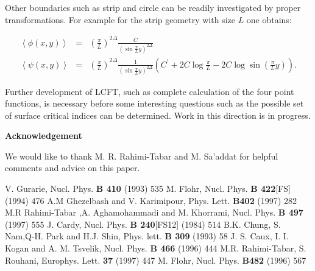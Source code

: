 Other boundaries such as strip and circle can be readily investigated by
proper transformations. For example for the strip geometry with size $L$ one obtains: 

\begin{eqnarray}
\left<\phi(x,y)\right>&=&\left(\frac {\pi}{L}
\right)^{2\Delta}\frac {C}{(\sin{\frac {\pi}{L}}{y})^{2\Delta}}\nonumber\\
\left<\psi(x,y)\right>&=&\left(\frac {\pi}{L}\right)^{2\Delta}
\frac {1}{(\sin{\frac {\pi}{L}}{y})^{2\Delta}}
\left(C^{\prime}+2C\log{\frac {\pi}{L}}-2C\log\sin({\frac {\pi}{L}}{y})
\right).
\end{eqnarray}

Further development of LCFT, such as complete calculation of the four point functions, 
is necessary before some interesting questions such as the possible 
set of surface critical indices can be determined. Work in this direction is in progress.


{\large {\bf Acknowledgement} }

We would like to thank M. R. Rahimi-Tabar and M. Sa'addat for helpful comments
and advice on this paper.

\begin{thebibliography}{99}
 V. Gurarie, Nucl. Phys. {\bf B 410} (1993) 535
 M. Flohr, Nucl. Phys. {\bf B 422}[FS] (1994) 476
 A.M Ghezelbash and V. Karimipour, Phys. Lett. {\bf B402} (1997) 282 
 M.R Rahimi-Tabar ,A. Aghamohammadi and M. Khorrami, Nucl. Phys. {\bf B 497} (1997) 555 
 J. Cardy, Nucl. Phys. {\bf B 240}[FS12] (1984) 514
 B.K. Chung, S. Nam,Q-H. Park and H.J. Shin, Phys. lett. {\bf B 309} (1993) 58
 J. S. Caux, I. I. Kogan and A. M. Tsvelik, Nucl. Phys. {\bf B 466} (1996) 444
 M.R. Rahimi-Tabar, S. Rouhani, Europhys. Lett. {\bf37} (1997) 447
 M. Flohr, Nucl. Phys. {\bf B482} (1996) 567 
\end{thebibliography}




